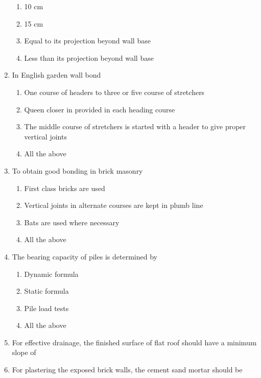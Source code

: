 \documentclass[11pt,a4paper]{article}
\begin{document}
\begin{enumerate}
\begin{enumerate}[label=\Alph*.]
\item{10 cm}
\item{15 cm}
\item{Equal to its projection beyond wall base}
\item{Less than its projection beyond wall base}
\end{enumerate}
\item{In English garden wall bond}
\begin{enumerate}[label=\Alph*.]
\item{One course of headers to three or five course of stretchers}
\item{Queen closer in provided in each heading course}
\item{The middle course of stretchers is started with a header to give proper vertical joints}
\item{All the above}
\end{enumerate}
\item{To obtain good bonding in brick masonry}
\begin{enumerate}[label=\Alph*.]
\item{First class bricks are used}
\item{Vertical joints in alternate courses are kept in plumb line}
\item{Bats are used where necessary}
\item{All the above}
\end{enumerate}
\item{The bearing capacity of piles is determined by}
\begin{enumerate}[label=\Alph*.]
\item{Dynamic formula}
\item{Static formula}
\item{Pile load tests}
\item{All the above}
\end{enumerate}
\item{For effective drainage, the finished surface of flat roof should have a minimum slope of}
\\
\item{For plastering the exposed brick walls, the cement sand mortar should be}

\end{enumerate}
\end{document}
